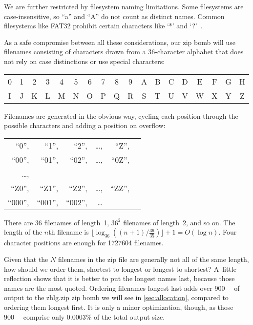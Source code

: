 \documentclass[letterpaper,twocolumn,10pt]{article}
\newcommand{\MB}{\mega\byte}
\begin{document}
We are further restricted by filesystem naming limitations.
Some filesystems are case-insensitive, so ``a'' and ``A'' do not count as distinct names.
Common filesystems like FAT32 prohibit certain characters like
`*' and `?'~\cite[\S Limits]{wiki-fs}.

As a safe compromise between all these considerations,
our zip bomb will use filenames consisting of characters
drawn from a 36-character alphabet
that does not
rely on case distinctions
or use special characters:

\begin{center}
\setlength{\tabcolsep}{2pt}
\begin{tabular}{cccccccccccccccccc}
0 & 1 & 2 & 3 & 4 & 5 & 6 & 7 & 8 & 9 & A & B & C & D & E & F & G & H \\
I & J & K & L & M & N & O & P & Q & R & S & T & U & V & W & X & Y & Z
\end{tabular}
\end{center}

\noindent
Filenames are generated in the obvious way,
cycling each position through the possible characters
and adding a position on overflow:

\begin{center}
\setlength{\tabcolsep}{2pt}
\begin{tabular}{rrrrrl}
``\mbox{0}'', &
``\mbox{1}'', &
``\mbox{2}'', &
\ldots, &
``\mbox{Z}'',
\\
``\mbox{00}'', &
``\mbox{01}'', &
``\mbox{02}'', &
\ldots, &
``\mbox{0Z}'',
\\
\ldots,
\\
``\mbox{Z0}'', &
``\mbox{Z1}'', &
``\mbox{Z2}'', &
\ldots, &
``\mbox{ZZ}'',
\\
``\mbox{000}'', &
``\mbox{001}'', &
``\mbox{002}'', &
\ldots
\end{tabular}
\end{center}

\noindent
There are $36$ filenames of length~\num{1},
$36^2$ filenames of length~\num{2}, and so on.
The length of the $n$\/th filename is
$\lfloor \log_{36}((n + 1) / \frac{36}{35})\rfloor + 1 = O(\log n)$.
Four character positions are enough for
\num{1727604} filenames.


Given that the $N$ filenames in the zip file
are generally not all of the same length,
how should we order them,
shortest to longest or longest to shortest?
A~little reflection shows that it is better to
put the longest names last, because those names are the most quoted.
Ordering filenames longest last
adds over \SI{900}{\MB} of output
to the \mbox{zblg.zip} zip bomb we will see in \autoref{sec:allocation},
compared to ordering them longest first.
It is only a minor optimization, though,
as those \SI{900}{\MB} comprise only \num{0.0003}\%
of the total output size.
\end{document}
